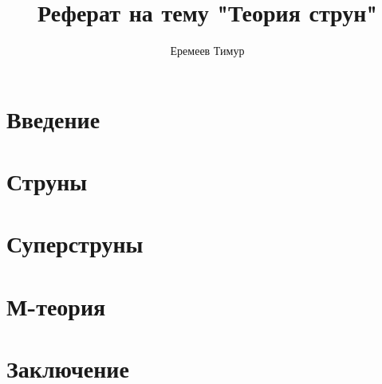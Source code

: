 \documentclass[a4paper 12pt]{article}
\title{Реферат на тему "Теория струн"}
\author{Еремеев Тимур}
\begin{document}
    \maketitle

    \section*{Введение}
    

    \section*{Струны}
    

    \section*{Суперструны}
    

    \section*{М-теория}
    

    \section*{Заключение}
    
\end{document}

